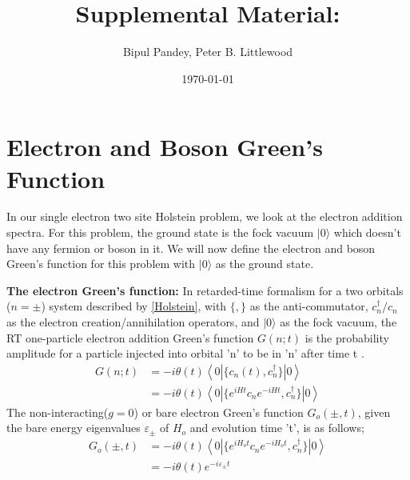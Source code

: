 \documentclass{article}
\begin{document}
\title{Supplemental Material:}%

\author{Bipul Pandey, Peter B. Littlewood}

\date{\today}%
\maketitle

\section{Electron and Boson Green's Function}
In our single electron two site Holstein problem, we look at the electron addition spectra. For this problem, the ground state is the fock vacuum $|0\rangle$ which doesn't have any fermion or boson in it. We will now define the electron and boson Green's function for this problem with $|0\rangle$ as the ground state.

\textbf{The electron Green's function: } In retarded-time formalism \cite{kas_cumulant_2014} for a two orbitals ($n =\pm$) system described by \eqref{Holstein}, with $\{,\}$ as the anti-commutator, $c_n^\dagger /c_n$ as the electron creation/annihilation operators, and ${|0\rangle}$ as the fock vacuum, the RT one-particle electron addition Green's function $G(n;t)$ is the probability amplitude for a particle injected into orbital 'n' to be in 'n' after time t \cite{goodvin_greens_2006}.
\begin{equation}
\begin{aligned}
    G(n;t) &= -i \theta(t)\left\langle 0|\{c_n(t) ,{c_n^{\dagger}}\}|0\right\rangle\\
    &= -i \theta(t)\left\langle 0|\{e^{iHt}c_n e^{-iHt} ,{c_n^{\dagger}}\}|0\right\rangle
\end{aligned}
\label{Greens def}
\end{equation}
 The non-interacting($g=0$) or bare electron Green's function $G_o(\pm,t)$, given the bare energy eigenvalues $\varepsilon_{\pm}$ of  $H_o$ and evolution time 't', is as follows;
\begin{equation}
\begin{aligned}
    G_o(\pm,t) &=-i \theta(t)\left\langle 0|\{e^{iH_ot}c_n e^{-iH_ot} ,{c_n^{\dagger}}\}|0\right\rangle\\
    &=-i\theta(t) e^{-i\varepsilon_\pm t} 
\end{aligned}
    \label{Bare electron greens}
\end{equation} 
\end{document}
